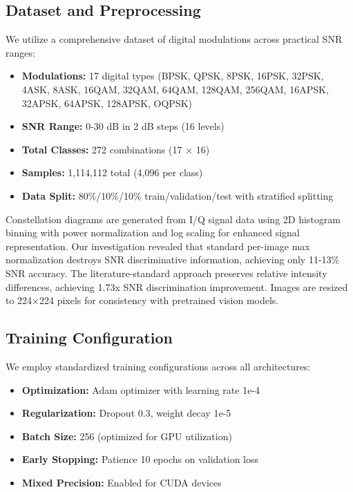 \documentclass{ELSP}
\begin{document}
\subsection{Dataset and Preprocessing}

We utilize a comprehensive dataset of digital modulations across practical SNR ranges:
\begin{itemize}
    \item \textbf{Modulations:} 17 digital types (BPSK, QPSK, 8PSK, 16PSK, 32PSK, 4ASK, 8ASK, 16QAM, 32QAM, 64QAM, 128QAM, 256QAM, 16APSK, 32APSK, 64APSK, 128APSK, OQPSK)
    \item \textbf{SNR Range:} 0-30 dB in 2 dB steps (16 levels)
    \item \textbf{Total Classes:} 272 combinations (17 × 16)
    \item \textbf{Samples:} 1,114,112 total (4,096 per class)
    \item \textbf{Data Split:} 80\%/10\%/10\% train/validation/test with stratified splitting
\end{itemize}

Constellation diagrams are generated from I/Q signal data using 2D histogram binning with power normalization and log scaling for enhanced signal representation. Our investigation revealed that standard per-image max normalization destroys SNR discriminative information, achieving only 11-13\% SNR accuracy. The literature-standard approach preserves relative intensity differences, achieving 1.73x SNR discrimination improvement. Images are resized to 224×224 pixels for consistency with pretrained vision models.

\subsection{Training Configuration}

We employ standardized training configurations across all architectures:
\begin{itemize}
    \item \textbf{Optimization:} Adam optimizer with learning rate 1e-4
    \item \textbf{Regularization:} Dropout 0.3, weight decay 1e-5
    \item \textbf{Batch Size:} 256 (optimized for GPU utilization)
    \item \textbf{Early Stopping:} Patience 10 epochs on validation loss
    \item \textbf{Mixed Precision:} Enabled for CUDA devices
\end{itemize}
\end{document}
